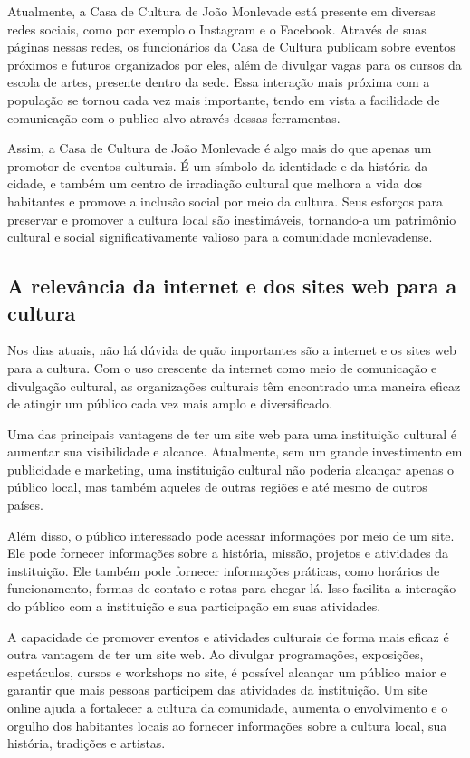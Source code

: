 Atualmente, a Casa de Cultura de João Monlevade está presente em diversas redes sociais, como por exemplo o Instagram e o Facebook. Através de suas páginas nessas redes, os funcionários da Casa de Cultura publicam sobre eventos próximos e futuros organizados por eles, além de divulgar vagas para os cursos da escola de artes, presente dentro da sede. Essa interação mais próxima com a população se tornou cada vez mais importante, tendo em vista a facilidade de comunicação com o publico alvo através dessas ferramentas.

Assim, a Casa de Cultura de João Monlevade é algo mais do que apenas um promotor de eventos culturais. É um símbolo da identidade e da história da cidade, e também um centro de irradiação cultural que melhora a vida dos habitantes e promove a inclusão social por meio da cultura. Seus esforços para preservar e promover a cultura local são inestimáveis, tornando-a um patrimônio cultural e social significativamente valioso para a comunidade monlevadense.


\subsection{A relevância da internet e dos sites web para a cultura}
Nos dias atuais, não há dúvida de quão importantes são a internet e os sites web para a cultura. Com o uso crescente da internet como meio de comunicação e divulgação cultural, as organizações culturais têm encontrado uma maneira eficaz de atingir um público cada vez mais amplo e diversificado.

Uma das principais vantagens de ter um site web para uma instituição cultural é aumentar sua visibilidade e alcance. Atualmente, sem um grande investimento em publicidade e marketing, uma instituição cultural não poderia alcançar apenas o público local, mas também aqueles de outras regiões e até mesmo de outros países.

Além disso, o público interessado pode acessar informações por meio de um site. Ele pode fornecer informações sobre a história, missão, projetos e atividades da instituição. Ele também pode fornecer informações práticas, como horários de funcionamento, formas de contato e rotas para chegar lá. Isso facilita a interação do público com a instituição e sua participação em suas atividades.

A capacidade de promover eventos e atividades culturais de forma mais eficaz é outra vantagem de ter um site web. Ao divulgar programações, exposições, espetáculos, cursos e workshops no site, é possível alcançar um público maior e garantir que mais pessoas participem das atividades da instituição. Um site online ajuda a fortalecer a cultura da comunidade, aumenta o envolvimento e o orgulho dos habitantes locais ao fornecer informações sobre a cultura local, sua história, tradições e artistas.

